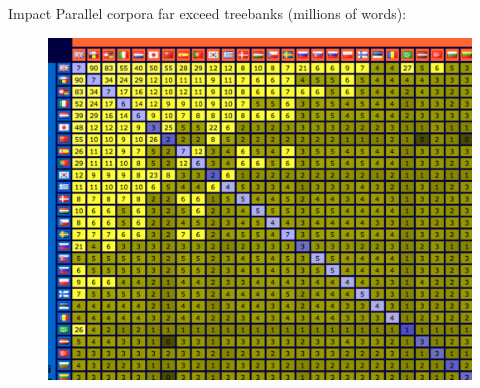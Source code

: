 \documentclass{beamer}
\begin{document}
\begin{frame}[t]{Impact}
Parallel corpora far exceed treebanks (millions of words):
  \begin{figure}
    {\centering \includegraphics[scale=0.7]{resource_matrix.pdf}}
  \end{figure}
\end{frame}
\end{document}
